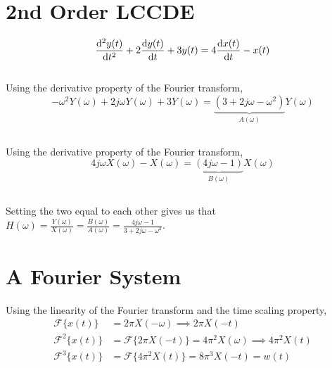 \documentclass{article}
\newcommand{\F}{\mathcal{F}}
\begin{document}
\section{2nd Order LCCDE}

\begin{equation}
    \dv[2]{y(t)}{t} + 2\dv{y(t)}{t} + 3 y(t) = 4\dv{x(t)}{t} - x(t)
\end{equation}

\subsection{}

Using the derivative property of the Fourier transform,
\begin{equation}
    -\omega^2 Y(\omega) + 2j \omega Y(\omega) + 3 Y(\omega) = \underbrace{(3 + 2j \omega - \omega^2)}_{A(\omega)} Y(\omega)
\end{equation}

\subsection{}

Using the derivative property of the Fourier transform,
\begin{equation}
    4j \omega X(\omega) - X(\omega) = \underbrace{(4j \omega - 1)}_{B(\omega)} X(\omega)
\end{equation}

\subsection{}

Setting the two equal to each other gives us that \(H(\omega) = \frac{Y(\omega)}{X(\omega)} = \frac{B(\omega)}{A(\omega)} = \frac{4j \omega - 1}{3 + 2j \omega - \omega^2}\).

\section{A Fourier System}

Using the linearity of the Fourier transform and the time scaling property,
\begin{align}
    \F\{x(t)\} &= 2\pi X(-\omega) \implies 2\pi X(-t)\\
    \F^2\{x(t)\} &= \F\{2\pi X(-t)\} = 4\pi^2 X(\omega) \implies 4\pi^2 X(t) \\
    \F^3\{x(t)\} &= \F\{4\pi^2 X(t)\} = 8\pi^3 X(-t) = w(t)
\end{align}
\end{document}
